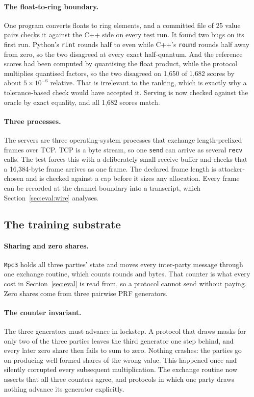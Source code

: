 \paragraph{The float-to-ring boundary.} One program converts floats to ring
elements, and a committed file of 25 value pairs checks it against the C++ side
on every test run. It found two bugs on its first run. Python's \texttt{rint}
rounds half to even while C++'s \texttt{round} rounds half away from zero, so the
two disagreed at every exact half-quantum. And the reference scores had been
computed by quantising the float product, while the protocol multiplies quantised
factors, so the two disagreed on 1{,}650 of 1{,}682 scores by about $5 \times
10^{-6}$ relative. That is irrelevant to the ranking, which is exactly why a
tolerance-based check would have accepted it. Serving is now checked against the
oracle by exact equality, and all 1{,}682 scores match.

\paragraph{Three processes.} The servers are three operating-system processes
that exchange length-prefixed frames over TCP. TCP is a byte stream, so one
\texttt{send} can arrive as several \texttt{recv} calls. The test forces this with
a deliberately small receive buffer and checks that a 16{,}384-byte frame arrives
as one frame. The declared frame length is attacker-chosen and is checked against
a cap before it sizes any allocation. Every frame can be recorded at the channel
boundary into a transcript, which Section~\ref{sec:eval:wire} analyses.

\subsection{The training substrate}
\label{sec:impl:mpc}

\paragraph{Sharing and zero shares.} \texttt{Mpc3} holds all three parties' state
and moves every inter-party message through one exchange routine, which counts
rounds and bytes. That counter is what every cost in Section~\ref{sec:eval} is
read from, so a protocol cannot send without paying. Zero shares come from three
pairwise PRF generators.

\paragraph{The counter invariant.} The three generators must advance in lockstep.
A protocol that draws masks for only two of the three parties leaves the third
generator one step behind, and every later zero share then fails to sum to zero.
Nothing crashes: the parties go on producing well-formed shares of the wrong
value. This happened once and silently corrupted every subsequent multiplication.
The exchange routine now asserts that all three counters agree, and protocols in
which one party draws nothing advance its generator explicitly.

